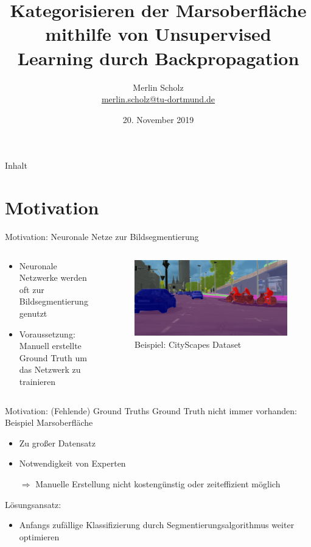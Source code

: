 \documentclass[9pt]{beamer}
\author[Merlin Scholz]{Merlin Scholz\\\href{mailto:merlin.scholz@tu-dortmund.de}{merlin.scholz@tu-dortmund.de}}
\title[Analyse der Marsoberfläche durch Unsupervised Learning]{Kategorisieren der Marsoberfläche mithilfe von Unsupervised Learning durch Backpropagation}
\date[20.11.2019]{20. November 2019}
\institute[TU Dortmund]{Mustererkennung,\\Informatik XII, Technische Universität Dortmund}
\begin{document}
\begin{frame}
\titlepage


\end{frame}

\begin{frame}{Inhalt}
	\tableofcontents
\end{frame}

\section{Motivation}

\begin{frame}{Motivation: Neuronale Netze zur Bildsegmentierung}
\begin{columns}
	\begin{column}{.5\textwidth}
		\begin{itemize}
			\item Neuronale Netzwerke werden oft zur Bildsegmentierung genutzt
			\item Voraussetzung: Manuell erstellte Ground Truth um das Netzwerk zu trainieren
			\end{itemize}
	\end{column}
	\begin{column}{.5\textwidth}
		\begin{figure}[H]
			\includegraphics[width=\textwidth,keepaspectratio]{koeln00.png}
			\caption{Beispiel: CityScapes Dataset\footnotemark[1] }
		\end{figure}
	\end{column}
\end{columns}
\end{frame}

\begin{frame}{Motivation: (Fehlende) Ground Truths}
Ground Truth nicht immer vorhanden: Beispiel Marsoberfläche
\begin{itemize}
	\item Zu großer Datensatz
	\item Notwendigkeit von Experten
	\item[$\Rightarrow$] Manuelle Erstellung nicht kostengünstig oder zeiteffizient möglich
\end{itemize}
\medskip
Lösungsansatz:
\begin{itemize}
	\item Anfangs zufällige Klassifizierung durch Segmentierungsalgorithmus weiter optimieren
\end{itemize}
\end{frame}
\end{document}
